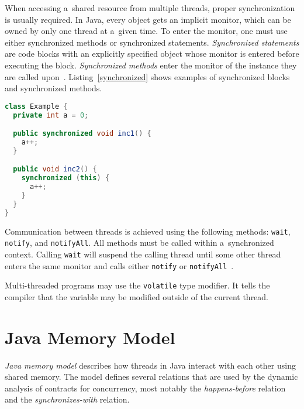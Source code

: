 When accessing a~shared resource from multiple threads, proper synchronization
is usually required. In Java, every object gets an implicit monitor, which can
be owned by only one thread at a~given time. To enter the monitor, one must use
either synchronized methods or synchronized statements.  \emph{Synchronized
statements} are code blocks with an explicitly specified object whose monitor is
entered before executing the block. \emph{Synchronized methods} enter the
monitor of the instance they are called upon~\cite{javaTheCompleteReference}.
Listing~\ref{synchronized} shows examples of synchronized blocks and synchronized
methods.

\begin{lstlisting}[language=java, label=synchronized, float=h, caption={A
program with synchronized methods and statements. The \texttt{inc1} method is
\emph{synchronized}, on each call, the \texttt{Example} instance's monitor is
entered. The \texttt{inc2} method is not synchronized but contains
a~\emph{synchronized block} with an explicitly specified monitor
(\texttt{this}).}]
class Example {
  private int a = 0;

  public synchronized void inc1() {
    a++;
  }

  public void inc2() {
    synchronized (this) {
      a++;
    }
  }
}
\end{lstlisting}

Communication between threads is achieved using the following methods:
\texttt{wait}, \texttt{notify}, and \texttt{notifyAll}. All methods must be
called within a~synchronized context. Calling \texttt{wait} will suspend the
calling thread until some other thread enters the same monitor and calls either
\texttt{notify} or \texttt{notifyAll}~\cite{javaTheCompleteReference}.

Multi-threaded programs may use the \texttt{volatile} type modifier. It tells
the compiler that the variable may be modified outside of the current thread.

\section{Java Memory Model}


\emph{Java memory model} describes how threads in Java interact with each other
using shared memory. The model defines several relations that are used by the
dynamic analysis of contracts for concurrency, most notably the
\emph{happens-before} relation and the \emph{synchronizes-with} relation.

